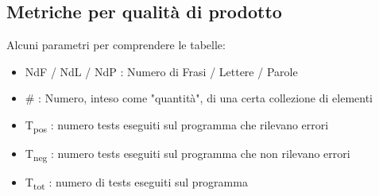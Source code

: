 \subsection{Metriche per qualità di prodotto}
Alcuni parametri per comprendere le tabelle:
\begin{itemize}
    \item NdF / NdL / NdP : Numero di Frasi / Lettere / Parole
    \item \# : Numero, inteso come "quantità", di una certa collezione di elementi 
    \item T\textsubscript{pos} : numero tests eseguiti sul programma che rilevano errori
    \item  T\textsubscript{neg} : numero tests eseguiti sul programma che non rilevano errori
    \item T\textsubscript{tot} : numero di tests eseguiti sul programma
\end{itemize}
